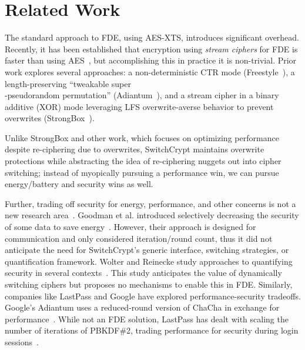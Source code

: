 \section{Related Work} \label{sec:related}

The standard approach to FDE, using AES-XTS, introduces significant overhead.
Recently, it has been established that encryption using \emph{stream ciphers}
for FDE is faster than using AES~\cite{StrongBox}, but accomplishing this in
practice it is non-trivial. Prior work explores several approaches: a
non-deterministic CTR mode (Freestyle~\cite{Freestyle}), a length-preserving
``tweakable super\\-pseudorandom permutation'' (Adiantum~\cite{Adiantum}), and a
stream cipher in a binary additive (XOR) mode leveraging LFS overwrite-averse
behavior to prevent overwrites (StrongBox~\cite{StrongBox}).

Unlike StrongBox and other work, which focuses on optimizing performance despite
re-ciphering due to overwrites, SwitchCrypt maintains overwrite protections
while abstracting the idea of re-ciphering nuggets out into cipher switching;
instead of myopically pursuing a performance win, we can pursue energy/battery
and security wins as well.

Further, trading off security for energy, performance, and other concerns is not
a new research area~\cite{ScalableSecurity, WolterReinecke, ZengChow1,
HaleemEtAl, LiOmiecinski, Merkel4, Merkle3}. Goodman et al. introduced
selectively decreasing the security of some data to save
energy~\cite{ScalableSecurity}. However, their approach is designed for
communication and only considered iteration/round count, thus it did not
anticipate the need for SwitchCrypt's generic interface, switching strategies,
or quantification framework. Wolter and Reinecke study approaches to quantifying
security in several contexts~\cite{WolterReinecke}. This study anticipates the
value of dynamically switching ciphers but proposes no mechanisms to enable this
in FDE. Similarly, companies like LastPass and Google have explored
performance-security tradeoffs. Google's Adiantum uses a reduced-round version
of ChaCha in exchange for performance~\cite{Adiantum}. While not an FDE
solution, LastPass has dealt with scaling the number of iterations of PBKDF\#2,
trading performance for security during login sessions~\cite{LastPass}.
